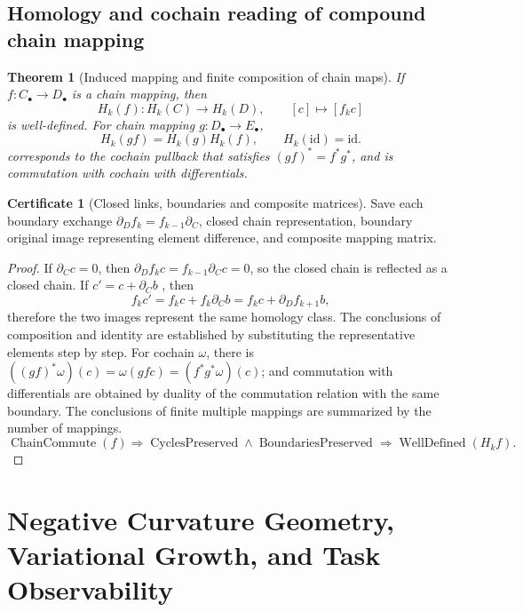 \documentclass[12pt,a4paper,openany,notitlepage]{report}
\theoremstyle{plain}
\newtheorem{theorem}{Theorem}[chapter]
\theoremstyle{definition}
\newtheorem*{certificate}{Certificate}
\theoremstyle{remark}
\begin{document}
\begin{CJK*}
\section { Homology and cochain reading of compound chain mapping }

\begin{theorem}
[Induced mapping and finite composition of chain maps]\label{exp:task:homology-functor}
If $f:C_\bullet\to D_\bullet$ is a chain mapping, then \[
 H_k(f):H_k(C)\to H_k(D),\qquad [c]\mapsto[f_kc]
\] is well-defined. For chain mapping $g:D_\bullet\to E_\bullet$, \[
 H_k(gf)=H_k(g)H_k(f),\qquad H_k(\mathrm{id})=\mathrm{id}.
\] corresponds to the cochain pullback that satisfies $(gf)^*=f^*g^*$, and is commutation with cochain with differentials.\end{theorem}
\begin{certificate}
[Closed links, boundaries and composite matrices]Save each boundary exchange $\partial_Df_k=f_{k-1}\partial_C$, closed chain representation, boundary original image representing element difference, and composite mapping matrix.\end{certificate}
\begin{proof}
If $\partial_Cc=0$, then $\partial_Df_kc=f_{k-1}\partial_Cc=0$, so the closed chain is reflected as a closed chain. If $c'=c+\partial_Cb$ , then \[
 f_kc'=f_kc+f_k\partial_Cb
 =f_kc+\partial_Df_{k+1}b,
\] therefore the two images represent the same homology class. The conclusions of composition and identity are established by substituting the representative elements step by step. For cochain $\omega$, there is $((gf)^*\omega)(c)=\omega(gfc)=(f^*g^*\omega)(c)$; and commutation with differentials are obtained by duality of the commutation relation with the same boundary. The conclusions of finite multiple mappings are summarized by the number of mappings. \[
 \operatorname{ChainCommute}(f)
 \Rightarrow\operatorname{CyclesPreserved}\land\operatorname{BoundariesPreserved}
 \Rightarrow\operatorname{WellDefined}(H_kf).
\]\end{proof}


\chapter{Negative Curvature Geometry, Variational Growth, and Task Observability}
\label{exp:ch:geometry}


\label{hgov:geo:section}


\end{CJK*}
\end{document}
